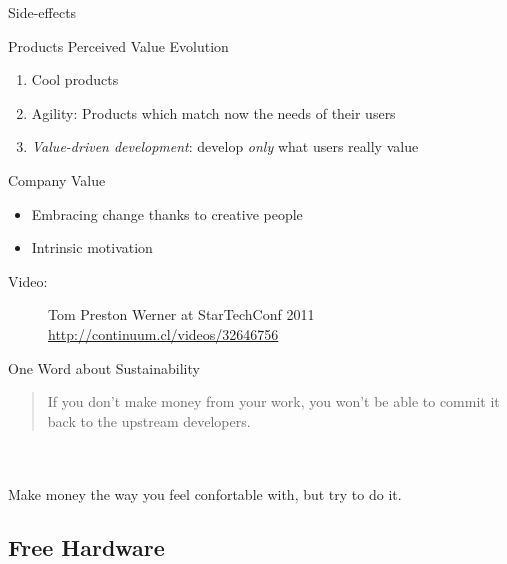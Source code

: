   \begin{frame}{Side-effects}
    \begin{block}{Products Perceived Value Evolution}
      \begin{enumerate}
        \item Cool products
        \item Agility: Products which match \alert{now} the needs of their users
        \item \emph{Value-driven development}: develop \emph{only} what users really value
      \end{enumerate}
    \end{block}
    \begin{block}{Company Value}
      \begin{itemize}
        \item Embracing change thanks to creative people
        \item Intrinsic motivation \cite{pink2011drive}
      \end{itemize}
    \end{block}
    \begin{description}
      \item[Video:] Tom Preston Werner at StarTechConf 2011 \url{http://continuum.cl/videos/32646756}
    \end{description}
  \end{frame}

  \begin{frame}{One Word about Sustainability}
      \hspace{.9em}\vspace{-1.4em}
      \begin{quote}
        If you don't make money from your work, you won't be able to commit it back to the upstream developers.\hspace{.5em}
      \end{quote}\\~\\ \vfill
      Make money the way you feel confortable with, but try to do it.
  \end{frame}

%
\subsection{Free Hardware}

